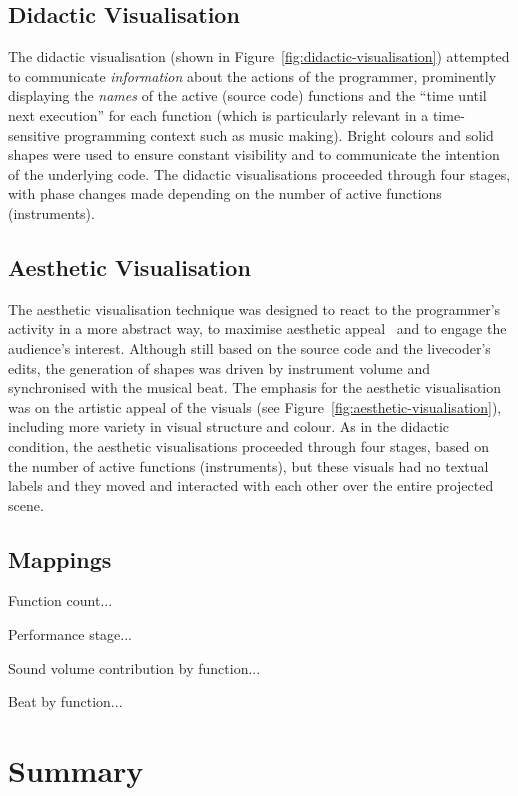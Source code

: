 \subsection{Didactic Visualisation}
\label{sec:didactic-visualisation}

The didactic visualisation (shown in Figure~\ref{fig:didactic-visualisation}) attempted to communicate \emph{information} about the actions of the programmer, prominently displaying the \emph{names} of the active (source code) functions and the ``time until next execution'' for each function (which is particularly relevant in a time-sensitive programming context such as music making). Bright colours and solid shapes were used to ensure constant visibility and to communicate the intention of the underlying code. The didactic visualisations proceeded through four stages, with phase changes made depending on the number of active functions (instruments).

\subsection{Aesthetic Visualisation}
\label{sec:aesthetic-visualisation}

The aesthetic visualisation technique was designed to react to the programmer's activity in a more abstract way, to maximise aesthetic appeal~\cite{Cawthon2007} and to engage the audience's interest. Although still based on the source code and the livecoder's edits, the generation of shapes was driven by instrument volume and synchronised with the musical beat. The emphasis for the aesthetic visualisation was on the artistic appeal of the visuals (see Figure~\ref{fig:aesthetic-visualisation}), including more variety in visual structure and colour. As in the didactic condition, the aesthetic visualisations proceeded through four stages, based on the number of active functions (instruments), but these visuals had no textual labels and they moved and interacted with each other over the entire projected scene.

\subsection{Mappings}

Function count...

Performance stage...

Sound volume contribution by function...

Beat by function...

\section{Summary}

 


